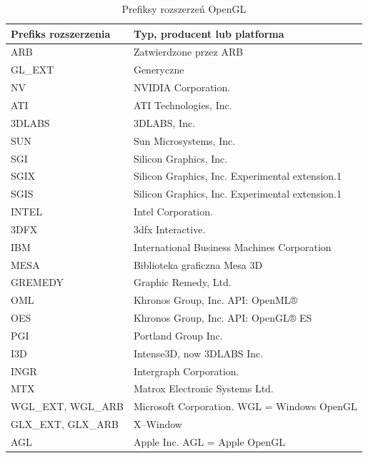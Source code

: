 \documentclass[archive]{mgr}
\begin{document}
\begin{table}[]

    \centering %
    \caption{Prefiksy rozszerzeń OpenGL}
    		\label{OpenGLExtensionsTable}
    \vspace{2mm} %
\begin{tabular}{|l|l|}
\hline
\textbf{Prefiks rozszerzenia} & \textbf{Typ, producent lub platforma} \\ \hline
ARB                           & Zatwierdzone przez ARB                \\ \hline
GL\_EXT                       &Generyczne                            \\ \hline
NV	& NVIDIA Corporation.\\ \hline
ATI	& ATI Technologies, Inc.\\ \hline
3DLABS	& 3DLABS, Inc.\\ \hline
SUN	& Sun Microsystems, Inc.\\ \hline
SGI	& Silicon Graphics, Inc.\\ \hline
SGIX &	Silicon Graphics, Inc. Experimental extension.1\\ \hline
SGIS &	Silicon Graphics, Inc. Experimental extension.1\\ \hline
INTEL &	Intel Corporation.\\ \hline
3DFX &	3dfx Interactive.\\ \hline
IBM &	International Business Machines Corporation\\ \hline
MESA &	Biblioteka graficzna Mesa 3D\\ \hline
GREMEDY &	Graphic Remedy, Ltd.\\ \hline
OML &	Khronos Group, Inc. API: OpenML®\\ \hline
OES &	Khronos Group, Inc. API: OpenGL® ES\\ \hline
PGI &	Portland Group Inc.\\ \hline
I3D &	Intense3D, now 3DLABS Inc.\\ \hline
INGR &	Intergraph Corporation.\\ \hline
MTX &	Matrox Electronic Systems Ltd.\\ \hline
WGL\_EXT, WGL\_ARB &	Microsoft Corporation. WGL = Windows OpenGL\\ \hline
GLX\_EXT, GLX\_ARB &	X–Window\\ \hline
AGL &	Apple Inc. AGL = Apple OpenGL\\ \hline
\end{tabular}
\end{table}
\end{document}
